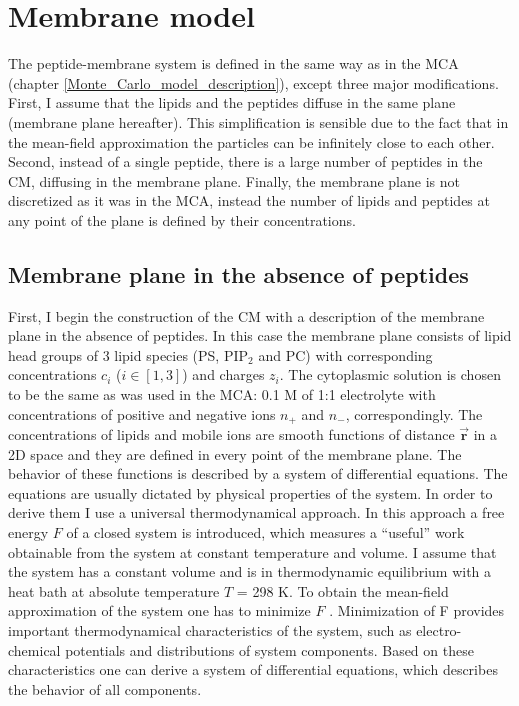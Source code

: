 \section{Membrane model}

The peptide-membrane system is defined in the same way as in the MCA (chapter \ref{Monte_Carlo_model_description}), except three major modifications. First, I assume that the lipids and the peptides diffuse in the same plane (membrane plane hereafter). This simplification is sensible due to the fact that in the mean-field approximation the particles can be infinitely close to each other. Second, instead of a single peptide, there is a large number of peptides in the CM, diffusing in the membrane plane. Finally, the membrane plane is not discretized as it was in the MCA, instead the number of lipids and peptides at any point of the plane is defined by their concentrations.

\subsection{Membrane plane in the absence of peptides}

First, I begin the construction of the CM with a description of the membrane plane in the absence of peptides. In this case the membrane plane consists of lipid head groups of 3 lipid species (PS, PIP$_2$ and PC) with corresponding concentrations $c_i$ ($i\in[1,3]$) and charges $z_i$. The cytoplasmic solution is chosen to be the same as was used in the MCA: 0.1 M of 1:1 electrolyte with concentrations of positive and negative ions $n_+$ and $n_-$, correspondingly. The concentrations of lipids and mobile ions are smooth functions of distance $\vec{\mathbf{r}}$ in a 2D space and they are defined in every point of the membrane plane. The behavior of these functions is described by a system of differential equations. The equations are usually dictated by physical properties of the system. In order to derive them I use a universal thermodynamical approach. In this approach a free energy $F$ of a closed system is introduced, which measures a ``useful'' work obtainable from the system at constant temperature and volume. I assume that the system has a constant volume and is in thermodynamic equilibrium with a heat bath at absolute temperature $T$ = 298 K. To obtain the mean-field approximation of the system one has to minimize $F$ \cite{Chaikin2000}. Minimization of F provides important thermodynamical characteristics of the system, such as electro-chemical potentials and distributions of system components. Based on these characteristics one can derive a system of differential equations, which describes the behavior of all components.

